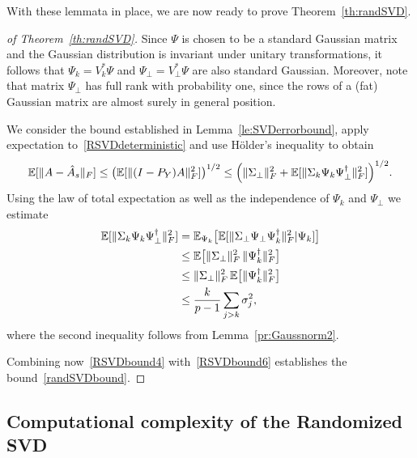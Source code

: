 With these lemmata in place, we are now ready to prove Theorem~\ref{th:randSVD}.
\begin{proof}[of Theorem~\ref{th:randSVD}]
Since $\Psi$ is chosen to be a standard Gaussian matrix and the Gaussian distribution is invariant under unitary transformations, it follows that $\Psi_k=V^{\ast}_k \Psi$ and $\Psi_\perp =V^{\ast}_\perp \Psi$ are also standard Gaussian. 
Moreover, note that matrix $\Psi_\perp$ has full rank with probability one, since the rows of a (fat) Gaussian matrix are almost surely in general position.

We consider the bound established in Lemma~\ref{le:SVDerrorbound}, apply expectation to~\eqref{RSVDdeterministic} and use H\"{o}lder's inequality to obtain
\begin{equation}\label{RSVDbound4}
\mathbb{E} [ \| A - \hat{A}_s\|_F]  
\le \big(\mathbb{E} [ \| (I-P_Y)A\|_F^2] \big)^{1/2}
\le \Big( \|\Sigma_\perp\|_F^2 + \mathbb{E} [\|\Sigma_k \Psi_k \Psi_\perp^{\dagger}\|_F^2 ]  \Big)^{1/2}.
\end{equation}
Using the law of total expectation as well as the independence of
$\Psi_k$ and $\Psi_\perp$ we estimate
\begin{align}%
\E [ \|\Sigma_k \Psi_k \Psi_\perp^{\dagger}\|_F^2 ]  & = \E_{\Psi_k} \big[ \E [ \| \Sigma_\perp \Psi_\perp \Psi_k^{\dagger} \|_F^2 | \Psi_k ] \big] \notag \\ 
& \le  \E \big [ \| \Sigma_\perp \|_F^2 \,  \|\Psi_k^{\dagger} \|_F^2 \big]  \notag \\
& \le  \| \Sigma_\perp \|_F^2 \, \E \big[ \|\Psi_k^{\dagger} \|_F^2 \big]  \notag \\
& \le  \frac{k}{p-1}  \sum_{j > k} \sigma_j^2, 
\label{RSVDbound6}
\end{align}
where the second  inequality follows from Lemma~\ref{pr:Gaussnorm2}.

Combining now~\eqref{RSVDbound4} with~\eqref{RSVDbound6} establishes the bound~\eqref{randSVDbound}.

\end{proof}


\subsection{Computational complexity of the Randomized SVD}

